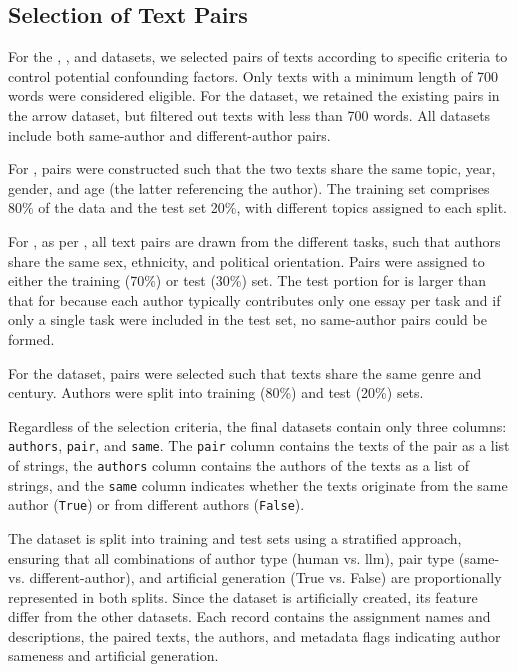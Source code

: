 \subsection{Selection of Text Pairs}
\label{subsec:dataset_text_pair_selection}

For the \dataBlog{}, \dataStudent{}, and \dataGutenberg{} datasets, we selected pairs of texts according to specific criteria to control potential confounding factors.
Only texts with a minimum length of \num{700} words were considered eligible. 
For the \dataPan{} dataset, we retained the existing pairs in the arrow dataset, but filtered out texts with less than 700 words. 
All datasets include both same-author and different-author pairs. 

For \dataBlog{}, pairs were constructed such that the two texts share the same topic, year, gender, and age (the latter referencing the author). 
The training set comprises 80\% of the data and the test set 20\%, with different topics assigned to each split.

For \dataStudent{}, as per \citet{koppel_determining_2014}, all text pairs are drawn from the different tasks, such that authors share the same sex, ethnicity, and political orientation. 
Pairs were assigned to either the training (70\%) or test (30\%) set. 
The test portion for \dataStudent{} is larger than that for \dataBlog{} because each author typically contributes only one essay per task and if only a single task were included in the test set, no same-author pairs could be formed. 

For the \dataGutenberg{} dataset, pairs were selected such that texts share the same genre and century. 
Authors were split into training (80\%) and test (20\%) sets.

Regardless of the selection criteria, the final datasets contain only three columns: \texttt{authors}, \texttt{pair}, and \texttt{same}.
The \texttt{pair} column contains the texts of the pair as a list of strings,
the \texttt{authors} column contains the authors of the texts as a list of strings,
and the \texttt{same} column indicates whether the texts originate from the same author (\texttt{True}) or from different authors (\texttt{False}).

The \dataArtificialStudent{} dataset is split into training and test sets using a stratified approach, ensuring that all combinations of author type (human vs. \ac{llm}), pair type (same- vs. different-author), and artificial generation (True vs. False) are proportionally represented in both splits. 
Since the \dataArtificialStudent{} dataset is artificially created, its feature differ from the other datasets. 
Each record contains the assignment names and descriptions, the paired texts, the authors, and metadata flags indicating author sameness and artificial generation.


